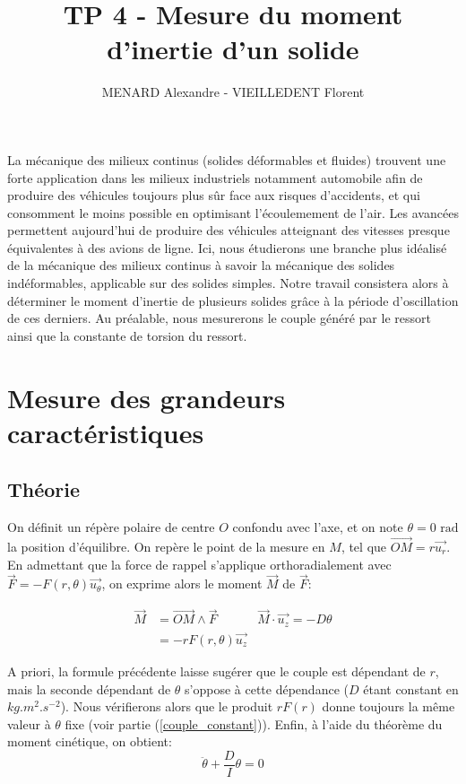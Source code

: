 \documentclass[12pt]{article}
\title{\vspace{-2cm}\textbf{TP 4 - Mesure du moment d'inertie d'un solide}}
\author{\vspace{-0.5cm}MENARD Alexandre - VIEILLEDENT Florent}
\date{\vspace{-0.7cm}}
\newcommand{\ut}{\vec{u_\theta}}
\newcommand{\ur}{\vec{u_r}}
\newcommand{\uz}{\vec{u_z}}
\begin{document}
\maketitle

La mécanique des milieux continus (solides déformables et fluides) trouvent une forte application dans les milieux industriels notamment automobile afin de produire
des véhicules toujours plus sûr face aux risques d'accidents, et qui consomment le moins possible en optimisant l'écoulemement de l'air. Les avancées permettent aujourd'hui
de produire des véhicules atteignant des vitesses presque équivalentes à des avions de ligne. Ici, nous étudierons une branche plus idéalisé de la mécanique des milieux continus à savoir la mécanique des solides
indéformables, applicable sur des solides simples. Notre travail consistera alors à déterminer le moment d'inertie de plusieurs solides grâce à la période d'oscillation de ces derniers. Au préalable,
nous mesurerons le couple généré par le ressort ainsi que la constante de torsion du ressort.

\section{Mesure des grandeurs caractéristiques}
\subsection{Théorie}
On définit un répère polaire de centre $O$ confondu avec l'axe, et on note $\theta=0 \text{ rad}$ la position d'équilibre. On repère le point
de la mesure en $M$, tel que $\vec{OM} = r\ur$. En admettant que la force de rappel
s'applique orthoradialement avec $\vec{F} = -F(r, \theta) \ut$, on exprime alors le moment $\vec{M}$ de $\vec{F}$:

\begin{align}
    \vec{M} & = \vec{OM} \wedge \vec{F} & \vec{M} \cdot \uz = -D\theta \\
            & = -rF(r, \theta) \uz \nonumber
    \label{eqn:moment_ressort}
\end{align}

A priori, la formule précédente laisse sugérer que le couple est dépendant de $r$, mais la seconde dépendant de $\theta$
s'oppose à cette dépendance ($D$ étant constant en $kg.m^2.s^{-2}$). Nous vérifierons alors que le produit $rF(r)$ donne toujours la même valeur à $\theta$ fixe (voir partie (\ref{couple_constant})).
Enfin, à l'aide du théorème du moment cinétique, on obtient:
\begin{equation}
    \label{eqn:equa_diff}
    \ddot \theta + \frac{D}{I}\theta = 0
\end{equation}
\end{document}
